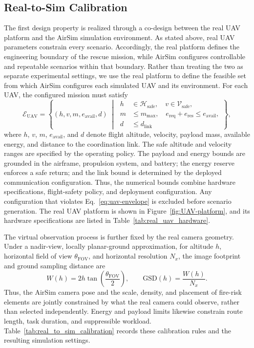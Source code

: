 \subsection{Real-to-Sim Calibration}
The first design property is realized through a co-design between the real UAV
platform and the AirSim simulation environment. As stated above, real UAV
parameters constrain every scenario. Accordingly, the real platform defines the
engineering boundary of the rescue mission, while AirSim configures controllable
and repeatable scenarios within that boundary. Rather than treating the two as
separate experimental settings, we use the real platform to define the feasible
set from which AirSim configures each simulated UAV and its environment.
For each UAV, the configured mission must satisfy
\begin{equation}
\mathcal{E}_{\mathrm{UAV}}=
\left\{(h,v,m,e_{\mathrm{avail}},d)\;\middle|\;
\begin{aligned}
    h &\in \mathcal{H}_{\mathrm{safe}},\quad v \in \mathcal{V}_{\mathrm{safe}},\\
    m &\leq m_{\max},\quad e_{\mathrm{req}}+e_{\mathrm{res}} \leq e_{\mathrm{avail}},\\
    d &\leq d_{\mathrm{link}}
\end{aligned}
\right\},
\label{eq:uav-envelope}
\end{equation}
where $h$, $v$, $m$, $e_{\mathrm{avail}}$, and $d$ denote flight altitude,
velocity, payload mass, available energy, and distance to the coordination link. The safe altitude
and velocity ranges are specified by the operating policy. The payload and energy
bounds are grounded in the airframe, propulsion system, and battery; the energy
reserve enforces a safe return; and the link bound is determined by the deployed
communication configuration. Thus, the numerical bounds combine hardware
specifications, flight-safety policy, and deployment configuration. Any
configuration that violates
Eq.~\ref{eq:uav-envelope} is excluded before scenario generation. The real UAV
platform is shown in Figure~\ref{fig:UAV-platform}, and its hardware
specifications are listed in Table~\ref{tab:real_uav_hardware}.



The virtual observation process is further fixed by the real camera geometry.
Under a nadir-view, locally planar-ground approximation, for altitude $h$,
horizontal field of view $\theta_{\mathrm{FOV}}$, and horizontal
resolution $N_x$, the image footprint and ground sampling distance are
\begin{equation}
W(h)=2h\tan\left(\frac{\theta_{\mathrm{FOV}}}{2}\right),\qquad
\mathrm{GSD}(h)=\frac{W(h)}{N_x}.
\label{eq:observation-geometry}
\end{equation}
Thus, the AirSim camera pose and the scale, density, and placement of fire-risk
elements are jointly constrained by what the real camera could observe, rather
than selected independently. Energy and payload limits likewise constrain route
length, task duration, and suppressible workload. Table~\ref{tab:real_to_sim_calibration}
records these calibration rules and the resulting simulation settings.

